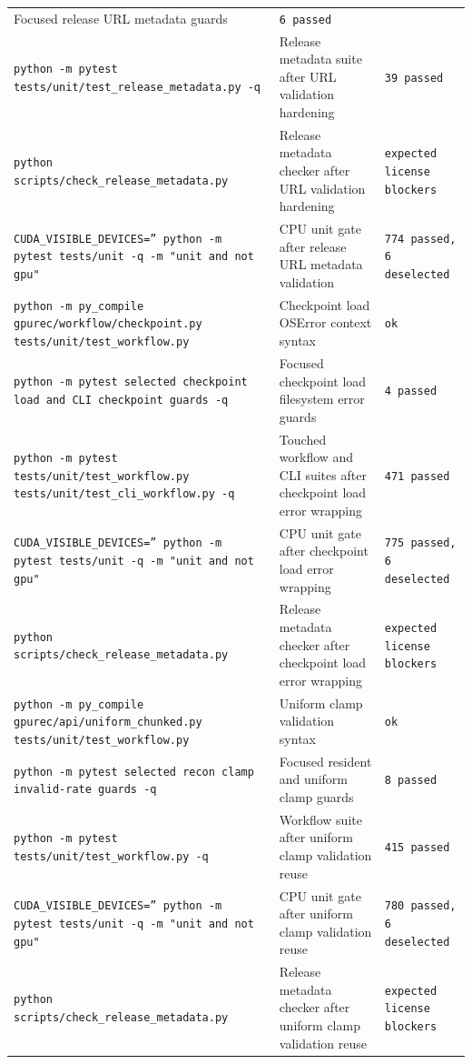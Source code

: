 \documentclass[11pt]{article}
\begin{document}
\begin{center}
\begin{tabular}{lll}
Focused release URL metadata guards &
\texttt{6 passed} \\
\texttt{python -m pytest tests/unit/test\_release\_metadata.py -q} &
Release metadata suite after URL validation hardening &
\texttt{39 passed} \\
\texttt{python scripts/check\_release\_metadata.py} &
Release metadata checker after URL validation hardening &
\texttt{expected license blockers} \\
\texttt{CUDA\_VISIBLE\_DEVICES='' python -m pytest tests/unit -q -m "unit and not gpu"} &
CPU unit gate after release URL metadata validation &
\texttt{774 passed, 6 deselected} \\
\texttt{python -m py\_compile gpurec/workflow/checkpoint.py tests/unit/test\_workflow.py} &
Checkpoint load OSError context syntax &
\texttt{ok} \\
\texttt{python -m pytest selected checkpoint load and CLI checkpoint guards -q} &
Focused checkpoint load filesystem error guards &
\texttt{4 passed} \\
\texttt{python -m pytest tests/unit/test\_workflow.py tests/unit/test\_cli\_workflow.py -q} &
Touched workflow and CLI suites after checkpoint load error wrapping &
\texttt{471 passed} \\
\texttt{CUDA\_VISIBLE\_DEVICES='' python -m pytest tests/unit -q -m "unit and not gpu"} &
CPU unit gate after checkpoint load error wrapping &
\texttt{775 passed, 6 deselected} \\
\texttt{python scripts/check\_release\_metadata.py} &
Release metadata checker after checkpoint load error wrapping &
\texttt{expected license blockers} \\
\texttt{python -m py\_compile gpurec/api/uniform\_chunked.py tests/unit/test\_workflow.py} &
Uniform clamp validation syntax &
\texttt{ok} \\
\texttt{python -m pytest selected recon clamp invalid-rate guards -q} &
Focused resident and uniform clamp guards &
\texttt{8 passed} \\
\texttt{python -m pytest tests/unit/test\_workflow.py -q} &
Workflow suite after uniform clamp validation reuse &
\texttt{415 passed} \\
\texttt{CUDA\_VISIBLE\_DEVICES='' python -m pytest tests/unit -q -m "unit and not gpu"} &
CPU unit gate after uniform clamp validation reuse &
\texttt{780 passed, 6 deselected} \\
\texttt{python scripts/check\_release\_metadata.py} &
Release metadata checker after uniform clamp validation reuse &
\texttt{expected license blockers} \\

\end{tabular}
\end{center}
\end{document}

